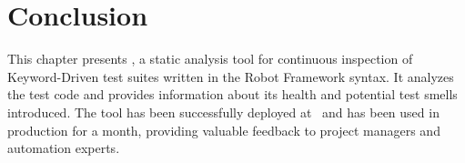\section{Conclusion}

This chapter presents \tool, a static analysis tool for continuous inspection of Keyword-Driven test suites written in the Robot Framework syntax. It analyzes the test code and provides information about its health and potential test smells introduced. The tool has been successfully deployed at \BGL~and has been used in production for a month, providing valuable feedback to project managers and automation experts. 
